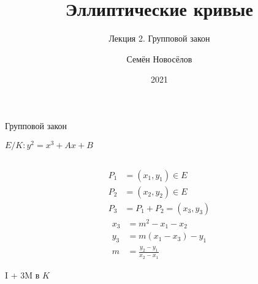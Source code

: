 \documentclass{beamer}
\title{Эллиптические кривые}
\subtitle{Лекция 2. Групповой закон}
\author{Семён Новосёлов}
\institute{БФУ им. И. Канта}
\date{2021}
\begin{document}
\frame{\titlepage}

\begin{frame}{Групповой закон}%
    \begin{center}
        $E/K: y^2 = x^3 + Ax + B$
    \end{center}
    \begin{columns}
        \begin{column}{0.5\textwidth}
            \begin{equation*}
                \begin{split}
                P_1 &= (x_1, y_1) \in E \\
                P_2 &= (x_2, y_2) \in E \\
                P_3 &= P_1 + P_2 = \left(x_3, y_3\right)
                \end{split}
            \end{equation*}
                \begin{equation*}
                    \begin{split}
                        x_3 &= m^2 - x_1 - x_2 \\
                        y_3 &= m\left( x_1 - x_3 \right) - y_1 \\
                        m &= \frac{y_2 - y_1}{x_2 - x_1}
                    \end{split}
                \end{equation*}
            \begin{center}
                \begin{tcolorbox}[enhanced,hbox,colback=box-blue-color!15,colframe=box-blue-color,title=Сложность,center title]
                    \begin{varwidth}{\textwidth}
                        \begin{center}
                            I + $3$M в $K$
                        \end{center}
                    \end{varwidth}
                \end{tcolorbox}	
            \end{center}


\end{column}
\end{columns}
\end{frame}
\end{document}

